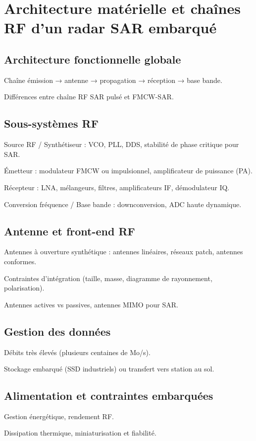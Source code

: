 \section{Architecture matérielle et chaînes RF d’un radar SAR embarqué}\label{SEC:Architecture matérielle et chaînes RF d’un radar SAR embarqué}

\subsection{Architecture fonctionnelle globale}

Chaîne émission → antenne → propagation → réception → base bande.

Différences entre chaîne RF SAR pulsé et FMCW-SAR.


\subsection{Sous-systèmes RF}

Source RF / Synthétiseur : VCO, PLL, DDS, stabilité de phase critique pour SAR.

Émetteur : modulateur FMCW ou impulsionnel, amplificateur de puissance (PA).

Récepteur : LNA, mélangeurs, filtres, amplificateurs IF, démodulateur IQ.

Conversion fréquence / Base bande : downconversion, ADC haute dynamique.


\subsection{Antenne et front-end RF}

Antennes à ouverture synthétique : antennes linéaires, réseaux patch, antennes conformes.

Contraintes d’intégration (taille, masse, diagramme de rayonnement, polarisation).

Antennes actives vs passives, antennes MIMO pour SAR.


\subsection{Gestion des données}

Débits très élevés (plusieurs centaines de Mo/s).

Stockage embarqué (SSD industriels) ou transfert vers station au sol.


\subsection{Alimentation et contraintes embarquées}

Gestion énergétique, rendement RF.

Dissipation thermique, miniaturisation et fiabilité.